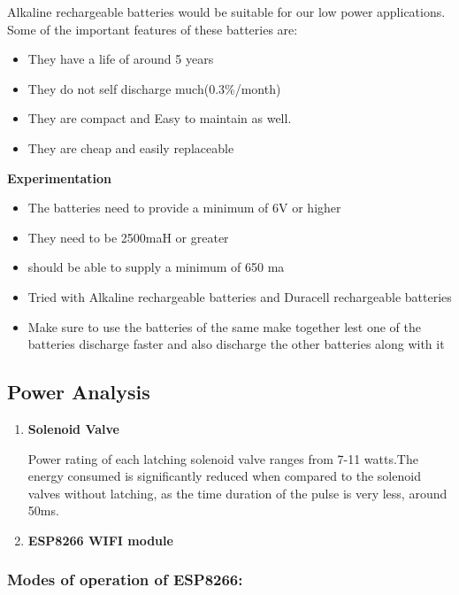\documentclass[16pt]{article}
\begin{document}
Alkaline rechargeable batteries would be suitable for our low power
applications. Some of the important features of these batteries are:
\hfill
\begin{itemize}

\item
  They have a life of around 5 years
\item
  They do not self discharge much(0.3\%/month)
\item
  They are compact and Easy to maintain as well.
\item
  They are cheap and easily replaceable
\end{itemize}

\hfill

{\Large{\textbf{Experimentation}}}

\begin{itemize}

\item
  The batteries need to provide a minimum of 6V or higher
\item
  They need to be 2500maH or greater
\item
  should be able to supply a minimum of 650 ma
\item
  Tried with Alkaline rechargeable batteries and Duracell rechargeable
  batteries
\item
  Make sure to use the batteries of the same make together lest one of
  the batteries discharge faster and also discharge the other batteries
  along with it
\end{itemize}

\hfill

\subsection{Power Analysis}


\begin{enumerate}
 
\item{\textbf{Solenoid Valve}}

Power rating of each latching solenoid valve
ranges from 7-11 watts.The energy consumed is significantly reduced when
compared to the solenoid valves without latching, as the time duration
of the pulse is very less, around 50ms.

\item{\textbf{ESP8266 WIFI module}}

\end{enumerate}

\subsubsection{Modes of operation of
ESP8266:}
\end{document}
